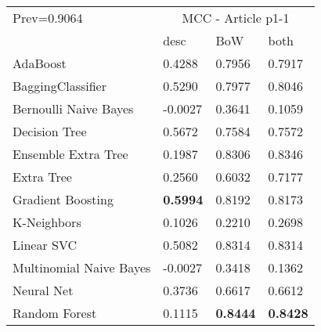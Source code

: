 \begin{tabular}{|l|l|l|l| }
\hline
Prev=0.9064 &  \multicolumn{3}{c|}{MCC - Article p1-1} \\
\cline{2-4} & desc & BoW & both \\ \hline
AdaBoost                & 0.4288 & 0.7956 & 0.7917\\
BaggingClassifier       & 0.5290 & 0.7977 & 0.8046\\
Bernoulli Naive Bayes   & -0.0027 & 0.3641 & 0.1059\\
Decision Tree           & 0.5672 & 0.7584 & 0.7572\\
Ensemble Extra Tree     & 0.1987 & 0.8306 & 0.8346\\
Extra Tree              & 0.2560 & 0.6032 & 0.7177\\
Gradient Boosting       & {\bf 0.5994} & 0.8192 & 0.8173\\
K-Neighbors             & 0.1026 & 0.2210 & 0.2698\\
Linear SVC              & 0.5082 & 0.8314 & 0.8314\\
Multinomial Naive Bayes & -0.0027 & 0.3418 & 0.1362\\
Neural Net              & 0.3736 & 0.6617 & 0.6612\\
Random Forest           & 0.1115 & {\bf 0.8444} & {\bf 0.8428}\\
\hline
\end{tabular}